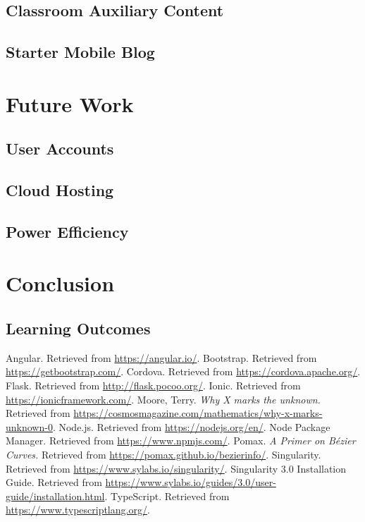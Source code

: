\documentclass[12pt]{report}
\begin{document}
    \section{Classroom Auxiliary Content}
    \section{Starter Mobile Blog}

\chapter{Future Work}
    \section{User Accounts}
    \section{Cloud Hosting}
    \section{Power Efficiency}

\chapter{Conclusion}
    \section{Learning Outcomes}

\begin{thebibliography}{9}
     Angular. Retrieved from \url{https://angular.io/}.
     Bootstrap. Retrieved from
        \url{https://getbootstrap.com/}.
     Cordova. Retrieved from \url{https://cordova.apache.org/}.
     Flask. Retrieved from \url{http://flask.pocoo.org/}.
     Ionic. Retrieved from \url{https://ionicframework.com/}.
     Moore, Terry. \textit{Why X marks the unknown.} Retrieved
        from \url{https://cosmosmagazine.com/mathematics/why-x-marks-unknown-0}.
     Node\@.js. Retrieved from \url{https://nodejs.org/en/}.
     Node Package Manager. Retrieved from \url{https://www.npmjs.com/}.
     Pomax. \textit{A Primer on Bézier Curves.} Retrieved from
        \url{https://pomax.github.io/bezierinfo/}.
     Singularity. Retrieved from \url{https://www.sylabs.io/singularity/}.
     Singularity 3\@.0 Installation Guide. Retrieved
        from
        \url{https://www.sylabs.io/guides/3.0/user-guide/installation.html}.
     TypeScript. Retrieved from
        \url{https://www.typescriptlang.org/}.
\end{thebibliography}
\end{document}
